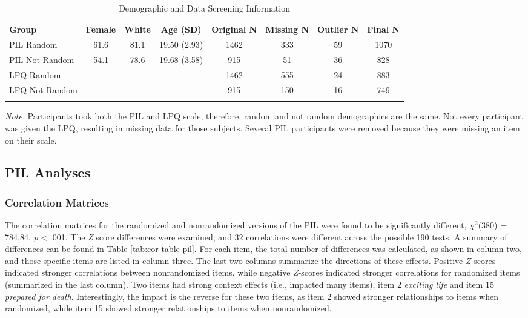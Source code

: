 \documentclass[english,man]{apa6}
\theoremstyle{definition}
\theoremstyle{definition}
\theoremstyle{definition}
\theoremstyle{remark}
\begin{document}
\begin{table}[tbp]
\begin{center}
\begin{threeparttable}
\caption{\label{tab:demo-table}Demographic and Data Screening Information}
\small{
\begin{tabular}{lccccccc}
\toprule
Group & \multicolumn{1}{c}{Female} & \multicolumn{1}{c}{White} & \multicolumn{1}{c}{Age (SD)} & \multicolumn{1}{c}{Original N} & \multicolumn{1}{c}{Missing N} & \multicolumn{1}{c}{Outlier N} & \multicolumn{1}{c}{Final N}\\
\midrule
PIL Random & 61.6 & 81.1 & 19.50 (2.93) & 1462 & 333 & 59 & 1070\\
PIL Not Random & 54.1 & 78.6 & 19.68 (3.58) & 915 & 51 & 36 & 828\\
LPQ Random & - & - & - & 1462 & 555 & 24 & 883\\
LPQ Not Random & - & - & - & 915 & 150 & 16 & 749\\
\bottomrule
\addlinespace
\end{tabular}
}
\begin{tablenotes}[para]
\textit{Note.} Participants took both the PIL and LPQ scale, therefore, random and not random demographics are the same. Not every participant was given the LPQ, resulting in missing data for those subjects. Several PIL participants were removed because they were missing an item on their scale.
\end{tablenotes}
\end{threeparttable}
\end{center}
\end{table}

\subsection{PIL Analyses}\label{pil-analyses}

\subsubsection{Correlation Matrices}\label{correlation-matrices}

The correlation matrices for the randomized and nonrandomized versions
of the PIL were found to be significantly different, \(\chi^2\)(380) =
784.84, \emph{p} \textless{} .001. The \emph{Z} score differences were
examined, and 32 correlations were different across the possible 190
tests. A summary of differences can be found in Table
\ref{tab:cor-table-pil}. For each item, the total number of differences
was calculated, as shown in column two, and those specific items are
listed in column three. The last two columns summarize the directions of
these effects. Positive \emph{Z}-scores indicated stronger correlations
between nonrandomized items, while negative \emph{Z}-scores indicated
stronger correlations for randomized items (summarized in the last
column). Two items had strong context effects (i.e., impacted many
items), item 2 \emph{exciting life} and item 15 \emph{prepared for
death}. Interestingly, the impact is the reverse for these two items, as
item 2 showed stronger relationships to items when randomized, while
item 15 showed stronger relationships to items when nonrandomized.
\end{document}

